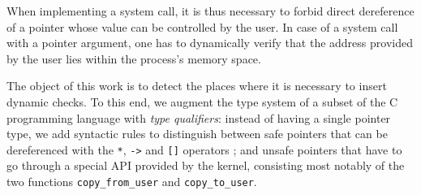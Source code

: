 When implementing a system call, it is thus necessary to forbid direct
dereference of a pointer whose value can be controlled by the user. In case of a
system call with a pointer argument, one has to dynamically verify that the
address provided by the user lies within the process's memory space.

The object of this work is to detect the places where it is necessary to insert
dynamic checks. To this end, we augment the type system of a subset of the C
programming language with \emph{type qualifiers}: instead of having a single
pointer type, we add syntactic rules to distinguish between safe pointers that
can be dereferenced with the \texttt{*}, \texttt{->} and \texttt{[]} operators ;
and unsafe pointers that have to go through a special API provided by the
kernel, consisting most notably of the two functions \texttt{copy\_from\_user}
and \texttt{copy\_to\_user}.
